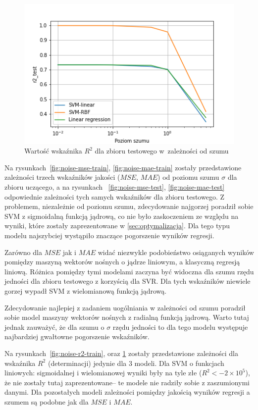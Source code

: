 \begin{figure}[h]
    \centering
    \includegraphics[width=1.1\columnwidth]{assets/r2_test.png}
    \caption{Wartość wskaźnika $R^2$ dla zbioru testowego w~zależności od szumu}
    \label{fig:noise-r2-test}
\end{figure}

Na rysunkach~\ref{fig:noise-mse-train}, \ref{fig:noise-mae-train} zostały przedstawione zależności trzech wskaźników jakości ($MSE$, $MAE$) od poziomu szumu $\sigma$ dla zbioru uczącego, a na rysunkach ~\ref{fig:noise-mse-test}, \ref{fig:noise-mae-test} odpowiednie zależności tych samych wskaźników dla zbioru testowego. Z problemem, niezależnie od poziomu szumu, zdecydowanie najgorzej poradził sobie SVM z sigmoidalną funkcją jądrową, co nie było zaskoczeniem ze względu na wyniki, które zostały zaprezentowane w \ref{sec:optymalizacja}. Dla tego typu modelu najszybciej wystąpiło znaczące pogorszenie wyników regresji. 

Zarówno dla $MSE$ jak i $MAE$ widać niezwykle podobieństwo osiąganych wyników pomiędzy maszyną wektorów nośnych o jądrze liniowym, a klasyczną regresją liniową. Różnica pomiędzy tymi modelami zaczyna być widoczna dla szumu rzędu jedności dla zbioru testowego z korzyścią dla SVR. Dla tych wskaźników niewiele gorzej wypadł SVM z wielomianową funkcją jądrową.

Zdecydowanie najlepiej z zadaniem uogólniania w zależności od szumu poradził sobie model maszyny wektorów nośnych z radialną funkcją jądrową. Warto tutaj jednak zauważyć, że dla szumu o $\sigma$ rzędu jedności to dla tego modelu występuje najbardziej gwałtowne pogorszenie wskaźników. 

Na rysunkach~\ref{fig:noise-r2-train}, oraz \ref{fig:noise-r2-test} zostały przedstawione zależności dla wskaźnika $R^2$ (determinacji) jedynie dla 3 modeli.  Dla SVM o funkcjach liniowych: sigmoidalnej i wielomianowej wyniki były na tyle złe ($R^2 < -2\times10^{5}$), że nie zostały tutaj zaprezentowane-- te modele nie radziły sobie z zaszumionymi danymi. Dla pozostałych modeli zależności pomiędzy jakością wyników regresji a szumem są podobne jak dla $MSE$ i $MAE$.
